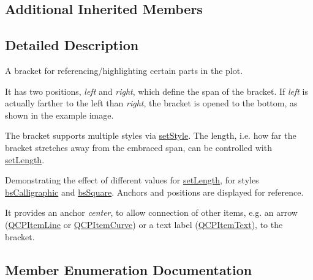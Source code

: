 \subsection*{Additional Inherited Members}


\subsection{Detailed Description}
A bracket for referencing/highlighting certain parts in the plot. 

 It has two positions, {\itshape left} and {\itshape right}, which define the span of the bracket. If {\itshape left} is actually farther to the left than {\itshape right}, the bracket is opened to the bottom, as shown in the example image.

The bracket supports multiple styles via \hyperlink{classQCPItemBracket_a612dffa2373422eef8754d690add3703}{set\+Style}. The length, i.\+e. how far the bracket stretches away from the embraced span, can be controlled with \hyperlink{classQCPItemBracket_ac7cfc3da7da9b5c5ac5dfbe4f0351b2a}{set\+Length}.

 \begin{center}Demonstrating the effect of different values for \hyperlink{classQCPItemBracket_ac7cfc3da7da9b5c5ac5dfbe4f0351b2a}{set\+Length}, for styles \hyperlink{classQCPItemBracket_a7ac3afd0b24a607054e7212047d59dbda8f29f5ef754e2dc9a9efdedb2face0f3}{bs\+Calligraphic} and \hyperlink{classQCPItemBracket_a7ac3afd0b24a607054e7212047d59dbda7f9df4a7359bfe3dac1dbe4ccf5d220c}{bs\+Square}. Anchors and positions are displayed for reference.\end{center} 

It provides an anchor {\itshape center}, to allow connection of other items, e.\+g. an arrow (\hyperlink{classQCPItemLine}{Q\+C\+P\+Item\+Line} or \hyperlink{classQCPItemCurve}{Q\+C\+P\+Item\+Curve}) or a text label (\hyperlink{classQCPItemText}{Q\+C\+P\+Item\+Text}), to the bracket. 

\subsection{Member Enumeration Documentation}
